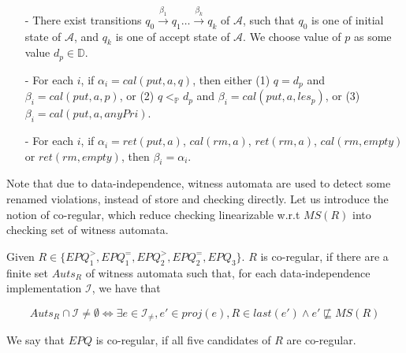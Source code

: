 \begin{itemize}
\setlength{\itemsep}{0.5pt}
\item[-] There exist transitions $q_0 \xrightarrow{\beta_1} q_1 \ldots \xrightarrow{\beta_k} q_k$ of $\mathcal{A}$, such that $q_0$ is one of initial state of $\mathcal{A}$, and $q_k$ is one of accept state of $\mathcal{A}$. We choose value of $p$ as some value $d_p \in \mathbb{D}$.

\item[-] For each $i$, if $\alpha_i = \textit{cal}(\textit{put},a,q)$, then either (1) $q = d_p$ and $\beta_i = \textit{cal}(\textit{put},a,p)$, or (2) $q <_{\mathbb{P}} d_p$ and $\beta_i = \textit{cal}(\textit{put},a,\textit{les}_p)$, or (3) $\beta_i = \textit{cal}(\textit{put},a,\textit{anyPri})$.

\item[-] For each $i$, if $\alpha_i = \textit{ret}(\textit{put},a)$, $\textit{cal}(\textit{rm},a)$, $\textit{ret}(\textit{rm},a)$, $\textit{cal}(\textit{rm},\textit{empty})$ or $\textit{ret}(\textit{rm},\textit{empty})$, then $\beta_i = \alpha_i$.
\end{itemize}

Note that due to data-independence, witness automata are used to detect some renamed violations, instead of store and checking directly. Let us introduce the notion of co-regular, which reduce checking linearizable w.r.t $\textit{MS}(R)$ into checking set of witness automata.

\begin{definition}\label{def:co-regular of rules of extended priority queues}
Given $R \in \{ \textit{EPQ}_1^{>}, \textit{EPQ}_1^{=}, \textit{EPQ}_2^{>}, \textit{EPQ}_2^{=}, \textit{EPQ}_3 \}$. $R$ is co-regular, if there are a finite set $\textit{Auts}_{R}$ of witness automata such that, for each data-independence implementation $\mathcal{I}$, we have that

$$\textit{Auts}_{R} \cap \mathcal{I} \neq \emptyset \Leftrightarrow \exists e \in \mathcal{I}_{\neq},e' \in \textit{proj}(e), R \in last(e') \wedge e' \not\sqsubseteq \textit{MS}(R)$$

We say that $\textit{EPQ}$ is co-regular, if all five candidates of $R$ are co-regular.
\end{definition}

